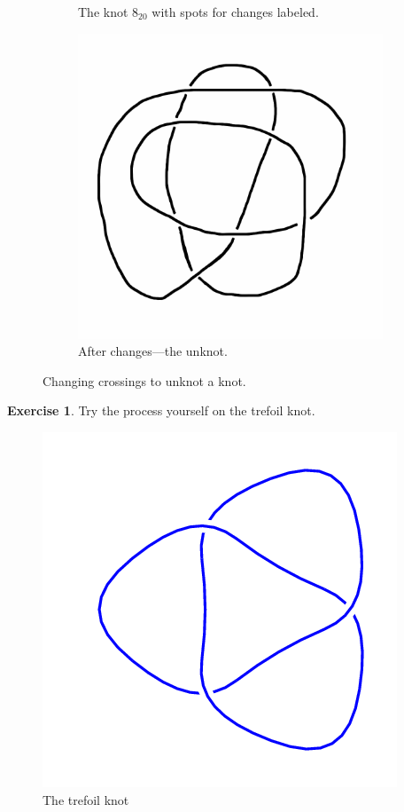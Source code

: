 \documentclass[12pt,letterpaper]{article}
\theoremstyle{definition}
\newtheorem{exercise}[question]{Exercise}
\begin{document}
\begin{figure}[h]
\begin{subfigure}{.3\textwidth}
        \caption{The knot $8_{20}$ with spots for changes labeled.}
    \end{subfigure}
    \begin{subfigure}{.3\textwidth}
        \centering
        \includegraphics[width=\textwidth]{knotpics/8-20-unknot.png}
        \caption{After changes---the unknot.}
    \end{subfigure}
    \caption{Changing crossings to unknot a knot.}
\end{figure}

\clearpage

\begin{exercise}
Try the process yourself on the trefoil knot.
\end{exercise}

\begin{figure}[h]
    \centering
    \includegraphics[width=.3\textwidth]{knotpics/3_1.png}
    \caption{The trefoil knot}
\end{figure}
\end{document}
